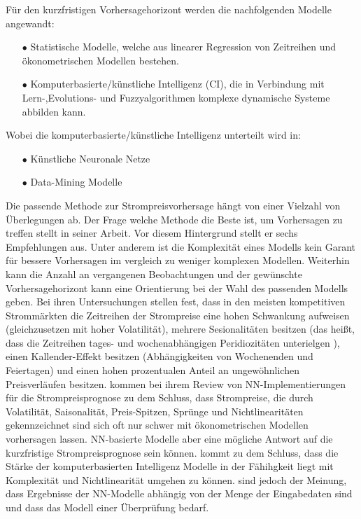 Für den kurzfristigen Vorhersagehorizont werden die nachfolgenden Modelle angewandt:
\begin{itemize}
\item[\textbf{$\bullet$}]%
Statistische Modelle, welche aus linearer Regression von Zeitreihen und ökonometrischen Modellen bestehen.

\item[\textbf{$\bullet$}]%
Komputerbasierte/künstliche Intelligenz (CI), die in Verbindung mit Lern-,Evolutions- und Fuzzyalgorithmen komplexe dynamische Systeme abbilden kann.
\end{itemize}

Wobei die komputerbasierte/künstliche Intelligenz unterteilt wird in: 
\begin{itemize}
\item[\textbf{$\bullet$}]%
Künstliche Neuronale Netze

\item[\textbf{$\bullet$}]%
Data-Mining Modelle
\end{itemize}


Die passende Methode zur Strompreisvorhersage hängt von einer Vielzahl von Überlegungen ab. Der Frage welche Methode die Beste ist, um Vorhersagen zu treffen stellt \citet{Chatfield1988} in seiner Arbeit. Vor diesem Hintergrund stellt er sechs Empfehlungen aus. Unter anderem ist die Komplexität eines Modells kein Garant für bessere Vorhersagen im vergleich zu weniger komplexen Modellen. Weiterhin kann die Anzahl an vergangenen Beobachtungen und der gewünschte Vorhersagehorizont kann eine Orientierung bei der Wahl des passenden Modells geben.
Bei ihren Untersuchungen stellen \citet{Nogales2002} fest, dass in den meisten kompetitiven Strommärkten die Zeitreihen der Strompreise eine hohen Schwankung aufweisen (gleichzusetzen mit hoher Volatilität), mehrere Sesionalitäten besitzen (das heißt, dass die Zeitreihen tages- und wochenabhängigen Peridiozitäten unterielgen ), einen Kallender-Effekt besitzen (Abhängigkeiten von Wochenenden und Feiertagen) und einen hohen prozentualen Anteil an ungewöhnlichen Preisverläufen besitzen. \citet{Vijayalakshmi2015} kommen bei ihrem Review von NN-Implementierungen für die Strompreisprognose zu dem Schluss, dass Strompreise, die durch Volatilität, Saisonalität, Preis-Spitzen, Sprünge und Nichtlinearitäten gekennzeichnet sind sich oft nur schwer mit ökonometrischen Modellen vorhersagen lassen. NN-basierte Modelle aber eine mögliche Antwort auf die kurzfristige Strompreisprognose sein können. \citet{Weron2014} kommt zu dem Schluss, dass die Stärke der komputerbasierten Intelligenz Modelle in der Fähihgkeit liegt mit Komplexität und Nichtlinearität umgehen zu können. \citet{Gareta2006} sind jedoch der Meinung, dass Ergebnisse der NN-Modelle abhängig von der Menge der Eingabedaten sind und dass das Modell einer Überprüfung bedarf.

